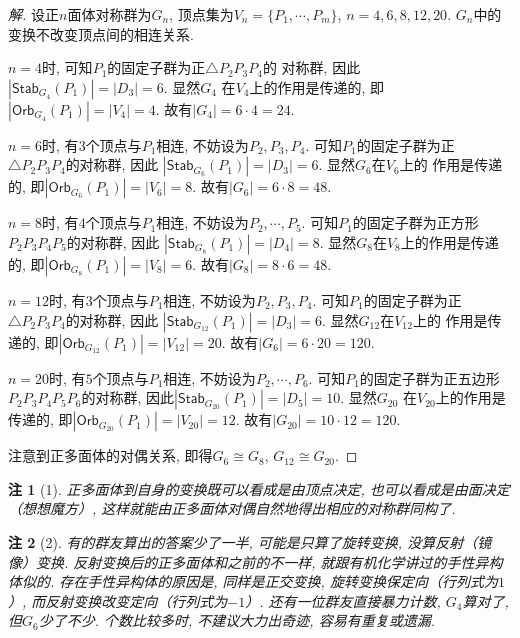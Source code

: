 \documentclass[12pt, a4paper, fontset=windows]{ctexart}
\newcommand{\Orb}{\mathsf{Orb}}
\newcommand{\Stab}{\mathsf{Stab}}
\newcommand{\abs}[1]{\left|{#1}\right|}
\newcommand{\isom}{\cong} %
\newcommand{\kh}[1]{（{#1}）} %
\newtheorem*{remark}{注}
\newenvironment{solution}{\begin{proof}[解]}{\end{proof}}
\begin{document}
\begin{solution}
设正$n$面体对称群为$G_n$, 顶点集为$V_n=\{P_1,\cdots,P_m\}$, 
$n=4,6,8,12,20$. $G_n$中的变换不改变顶点间的相连关系. 

$n=4$时, 可知$P_1$的固定子群为正$\triangle P_2P_3P_4$的
对称群, 因此$\abs{\Stab_{G_4}(P_1)}=\abs{D_3}=6$. 显然$G_4$
在$V_4$上的作用是传递的, 即$\abs{\Orb_{G_4}(P_1)}=\abs{V_4}=4$. 故有$\abs{G_4}=6\cdot 4=24$. 

$n=6$时, 有$3$个顶点与$P_1$相连, 不妨设为$P_2,P_3,P_4$. 
可知$P_1$的固定子群为正$\triangle P_2P_3P_4$的对称群, 因此
$\abs{\Stab_{G_6}(P_1)}=\abs{D_3}=6$. 显然$G_6$在$V_6$上的
作用是传递的, 即$\abs{\Orb_{G_6}(P_1)}=\abs{V_6}=8$. 故有$\abs{G_6}=6\cdot 8=48$. 

$n=8$时, 有$4$个顶点与$P_1$相连, 不妨设为$P_2,\cdots,P_5$. 
可知$P_1$的固定子群为正方形$P_2P_3P_4P_5$的对称群, 因此
$\abs{\Stab_{G_8}(P_1)}=\abs{D_4}=8$. 显然$G_8$在$V_8$上的作用是传递的, 
即$\abs{\Orb_{G_8}(P_1)}=\abs{V_8}=6$. 故有$\abs{G_8}=8\cdot 6=48$. 

$n=12$时, 有$3$个顶点与$P_1$相连, 不妨设为$P_2,P_3,P_4$. 
可知$P_1$的固定子群为正$\triangle P_2P_3P_4$的对称群, 因此
$\abs{\Stab_{G_{12}}(P_1)}=\abs{D_3}=6$. 显然$G_{12}$在$V_{12}$上的
作用是传递的, 即$\abs{\Orb_{G_{12}}(P_1)}=\abs{V_{12}}=20$. 故有$\abs{G_6}=6\cdot 20=120$. 

$n=20$时, 有$5$个顶点与$P_1$相连, 不妨设为$P_2,\cdots,P_6$. 
可知$P_1$的固定子群为正五边形$P_2P_3P_4P_5P_6$的对称群, 
因此$\abs{\Stab_{G_{20}}(P_1)}=\abs{D_5}=10$. 显然$G_{20}$
在$V_{20}$上的作用是传递的, 即$\abs{\Orb_{G_{20}}(P_1)}=\abs{V_{20}}=12$. 
故有$\abs{G_{20}}=10\cdot 12=120$. 

注意到正多面体的对偶关系, 即得$G_6\isom G_8$, $G_{12}\isom G_{20}$. 
\end{solution}

\begin{remark}[1]
正多面体到自身的变换既可以看成是由顶点决定, 也可以看成是由面决定\kh{想想魔方}, 这样就能由正多面体对偶自然地得出相应的对称群同构了. 
\end{remark}

\begin{remark}[2]
有的群友算出的答案少了一半, 可能是只算了旋转变换, 没算反射\kh{镜像}变换. 
反射变换后的正多面体和之前的不一样, 就跟有机化学讲过的手性异构体似的. 
存在手性异构体的原因是, 同样是正交变换, 旋转变换保定向\kh{行列式为$1$}, 而反射变换改变定向\kh{行列式为$-1$}. 
还有一位群友直接暴力计数, $G_4$算对了, 但$G_6$少了不少. 
个数比较多时, 不建议大力出奇迹, 容易有重复或遗漏. 
\end{remark}
\end{document}
